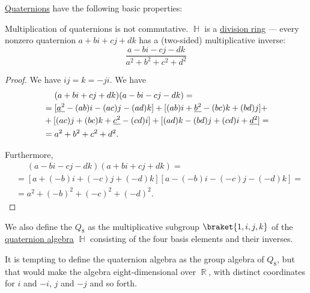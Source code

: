 \begin{proposition}\label{thm:def:quaternion_algebra}
  \hyperref[def:quaternion_algebra]{Quaternions} have the following basic properties:
  \begin{thmenum}
     Multiplication of quaternions is not commutative.
     \( \BbbH \) is a \hyperref[def:division_ring]{division ring} --- every nonzero quaternion \( a + bi + cj + dk \) has a (two-sided) multiplicative inverse:
    \begin{equation*}
      \frac {a - bi - cj - dk} {a^2 + b^2 + c^2 + d^2}
    \end{equation*}
  \end{thmenum}
\end{proposition}
\begin{proof}
   We have \( ij = k = -ji \).
   We have
  \begin{align*}
    &\phantom{{}={}}
    (a + bi + cj + dk) (a - bi - cj - dk)
    = \\ &=
    [\hi{a^2} - (ab)i - (ac)j - (ad)k]
    +
    [(ab)i + \hi{b^2} - (bc)k + (bd)j]
    + \\ &+
    [(ac)j + (bc)k + \hi{c^2} - (cd)i]
    +
    [(ad)k - (bd)j + (cd)i + \hi{d^2}]
    = \\ &=
    a^2 + b^2 + c^2 + d^2.
  \end{align*}

  Furthermore,
  \begin{align*}
    &\phantom{{}={}}
    (a - bi - cj - dk) (a + bi + cj + dk)
    = \\ &=
    [a + (-b) i + (-c) j + (-d) k] [a - (-b) i - (-c) j - (-d) k]
    = \\ &=
    a^2 + (-b)^2 + (-c)^2 + (-d)^2.
  \end{align*}
\end{proof}

\begin{definition}\label{def:quaternionic_group}
  We also define the  \( Q_8 \) as the multiplicative subgroup \( \braket{ 1, i, j, k } \) of the \hyperref[def:quaternion_algebra]{quaternion algebra} \( \BbbH \) consisting of the four basis elements and their inverses.
\end{definition}
\begin{comments}
  \item It is tempting to define the quaternion algebra as the group algebra of \( Q_8 \), but that would make the algebra eight-dimensional over \( \BbbR \), with distinct coordinates for \( i \) and \( -i \), \( j \) and \( -j \) and so forth.
\end{comments}
